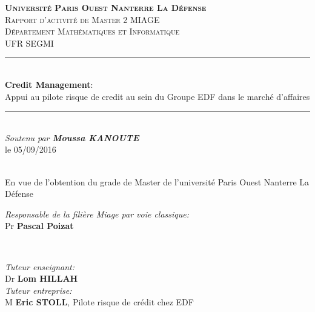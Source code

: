 \documentclass[11pt,a4paper]{article}
\begin{document}
\linespread{0.99}

\date{05 Septembre 2016}
\newcommand{\mydate}{\formatdate{4}{7}{2016}}

\begin{titlepage}
\newcommand{\HRule}{\rule{\linewidth}{0.5mm}}
\centering

\textsc{\large \textbf{Université Paris Ouest Nanterre La Défense}}\\[1.5cm] %

%
%
%
\textsc{\large Rapport d'activité de Master 2 MIAGE}\\[0.5cm] %
\textsc{\large Département Mathématiques et Informatique}\\[0.5cm] %
\textsc{\large UFR SEGMI}\\[0.5cm] 
\HRule \\[0.4cm]
{ \large  \textbf{Credit Management}:\\ Appui au pilote risque de credit au sein du Groupe EDF dans le marché d'affaires }\\[0.4cm] %
\HRule \\[1cm]
\emph{Soutenu par \textbf{Moussa KANOUTE}}\\ le 05/09/2016\date{04 Juillet 2016}\\[1cm]
\large En vue de l'obtention du grade de Master de l'université Paris Ouest Nanterre La Défense
\\[1cm]
\begin{minipage}{0.4\textwidth}
\begin{flushleft} \large
\emph{Responsable de la filière Miage par voie classique:} \\
Pr \textbf{Pascal Poizat} %

\end{flushleft}
\end{minipage}
~
\begin{minipage}{0.4\textwidth}
\begin{flushright} \large
\emph{Tuteur enseignant:}\\
Dr \textbf{Lom HILLAH}\\
\emph{Tuteur entreprise:}\\
M \textbf{Eric STOLL}, Pilote risque de crédit chez EDF
\end{flushright}
\end{minipage}\\[2cm]
\date{05 Septembre 2016}


\end{titlepage}
\end{document}
